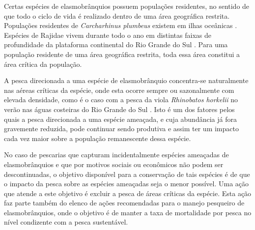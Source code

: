 \documentclass[a4paper,11pt,twoside,showtrims,onecolumn,openright,final]{memoir}
\begin{document}
Certas espécies de elasmobrânquios possuem populações residentes, no sentido de que todo 
o ciclo de vida é realizado dentro de uma área geográfica restrita. Populações residentes 
de \emph{Carcharhinus plumbeus} existem em ilhas oceânicas \citep{camhi1998}. %
Espécies de Rajidae vivem durante todo o ano em distintas faixas de profundidade da plataforma 
continental do Rio Grande do Sul \citep{vooren1997}. %
Para uma população residente de  uma área geográfica restrita, toda essa área constitui a área crítica  
da população.

A pesca direcionada a uma espécie de elasmobrânquio concentra-se naturalmente nas aéreas 
críticas da espécie, onde esta ocorre sempre ou sazonalmente com elevada densidade, como é o 
caso com a pesca da viola \emph{Rhinobatos horkelii} no verão nas águas costeiras 
do Rio Grande do Sul \citep{miranda2003}. %
Isto é um dos fatores pelos quais a pesca direcionada a uma espécie ameaçada, e cuja abundância 
já fora gravemente reduzida, pode continuar sendo produtiva e assim ter um impacto cada vez maior 
sobre a população remanescente dessa espécie.

No caso de pescarias que capturam incidentalmente espécies ameaçadas de elasmobrânquios 
e que por motivos sociais ou econômicos não podem ser descontinuadas, o objetivo disponível 
para a conservação de tais espécies é de que o impacto da pesca sobre as espécies ameaçadas 
seja o menor possível. Uma ação que atende a este objetivo é  excluir a pesca de áreas críticas 
da espécie. Esta ação faz parte também do elenco de ações recomendadas para o manejo pesqueiro de 
elasmobrânquios, onde o objetivo é de manter a taxa de mortalidade por pesca no nível 
condizente com a pesca sustentável.
\end{document}
